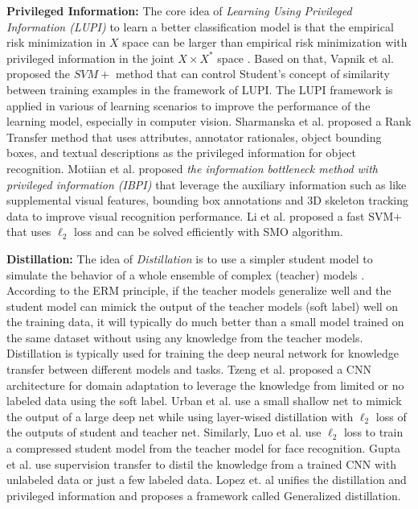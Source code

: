 \textbf{Privileged Information:} The core idea of \textit{Learning Using Privileged Information (LUPI)} to learn a better classification model is that the empirical risk minimization in $X$ space can be larger than empirical risk minimization with privileged information in the joint $X \times X^*$ space \cite{pechyony2010theory}. Based on that, Vapnik et al. \cite{vapnik2015learning} proposed the $SVM+$ method that can control Student's concept of similarity between training examples in the framework of LUPI. The LUPI framework is applied in various of learning scenarios to improve the performance of the learning model, especially in computer vision.  Sharmanska et al. \cite{Sharmanska_2013_ICCV} proposed a Rank Transfer method that uses attributes, annotator
rationales, object bounding boxes, and textual descriptions as the privileged information for object recognition. Motiian et al. \cite{Motiian_2016_CVPR} proposed \textit{the information bottleneck method with privileged information (IBPI)} that leverage the auxiliary information such as like supplemental visual features, bounding box annotations and 3D skeleton tracking data to improve visual recognition performance. Li et al. \cite{Li_2016_CVPR} proposed a fast SVM+ that uses $\ell_2$ loss and can be solved efficiently with SMO algorithm.

\textbf{Distillation:} The idea of \textit{Distillation} is to use a simpler student model to simulate the behavior of a whole ensemble
of complex (teacher) models \cite{hinton2015distilling}. According to the ERM principle, if the teacher models generalize well and the student model can mimick the output of the teacher models (soft label) well on the training data, it will typically do much better than a small model trained on the same dataset without using any knowledge from the teacher models. Distillation is typically used for training the deep neural network for knowledge transfer between different models and tasks. Tzeng et al. \cite{Tzeng_2015_ICCV} proposed a CNN architecture for domain adaptation to leverage the knowledge from limited or no labeled data using the soft label. Urban et al. \cite{urban2016deep} use a small shallow net to mimick the output of a large deep net while using layer-wised distillation with $\ell_2$ loss of the outputs of student and teacher net. Similarly, Luo et al. \cite{luo2016face} use $\ell_2$ loss to train a compressed student model from the teacher model for face recognition. Gupta et al. \cite{Gupta_2016_CVPR} use supervision transfer to distil the knowledge from a trained CNN with unlabeled data or just a few labeled data. Lopez et. al \cite{lopez2015unifying} unifies the distillation and privileged information and  proposes a framework called Generalized distillation.